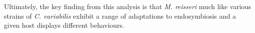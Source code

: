 Ultimately, the key finding from this analysis
is that \textit{M. reisseri} much like various strains of \textit{C. variabilis}
exhibit a range of adaptations to endosymbiosis and a given
host displays different behaviours. 


%

%
%
%
%
%
%
%
%


%
%
%


